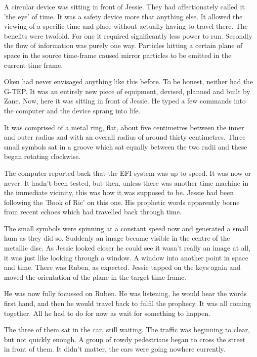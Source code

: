 A circular device was sitting in front of Jessie.  They had affectionately called it 'the eye' of time.  It was a safety device more that anything else.  It allowed the viewing of a specific time and place without actually having to travel there.  The benefits were twofold.  For one it required significantly less power to run.  Secondly the flow of information was purely one way.  Particles hitting a certain plane of space in the source time-frame caused mirror particles to be emitted in the current time frame.

Oken had never envisaged anything like this before.  To be honest, neither had the G-TEP.  It was an entirely new piece of equipment, devised, planned and built by Zane.  Now, here it was sitting in front of Jessie.  He typed a few commands into the computer and the device sprang into life.  

It was comprised of a metal ring, flat, about five centimetres between the inner and outer radius and with an overall radius of around thirty centimetres.  Three small symbols sat in a groove which sat equally between the two radii and these began rotating clockwise.

The computer reported back that the EFI system was up to speed.  It was now or never.  It hadn't been tested, but then, unless there was another time machine in the immediate vicinity, this was how it was supposed to be.  Jessie had been following the 'Book of Ric' on this one.  His prophetic words apparently borne from recent echoes which had travelled back through time.  

The small symbols were spinning at a constant speed now and generated a small hum as they did so.  Suddenly an image became visible in the centre of the metallic disc.  As Jessie looked closer he could see it wasn't really an image at all, it was just like looking through a window.  A window into another point in space and time.  There was Ruben, as expected.  Jessie tapped on the keys again and moved the orientation of the plane in the target time-frame.  

He was now fully focussed on Ruben.  He was listening, he would hear the words first hand, and then he would travel back to fulfil the prophecy.  It was all coming together.  All he had to do for now as wait for something to happen.



\thoughtbreak



The three of them sat in the car, still waiting.  The traffic was beginning to clear, but not quickly enough.  A group of rowdy pedestrians began to cross the street in front of them.  It didn't matter, the cars were going nowhere currently.  

